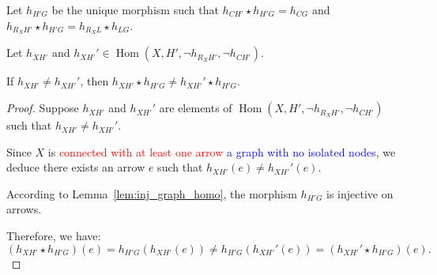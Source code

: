 \begin{lemma}
    \label{lem:1_dist}
    
            

    Let $h_{H'G}$ be the unique morphism such that $h_{CH'} \mathop{\star} h_{H'G} \mathop{=} h_{CG}$ and $h_{R_XH'} \mathop{\star} h_{H'G} \mathop{=} h_{R_XL} \mathop{\star} h_{LG}$.

    Let $h_{XH'}$ and $h_{XH'}' \mathop{\in} \operatorname{Hom}(X, H', \lnot h_{R_XH'}, \lnot h_{CH'})$. 
    
    If $h_{XH'} \mathop{\neq} h_{XH'}'$, then $h_{XH'} \mathop{\star} h_{H'G} \mathop{\neq} h_{XH'}' \mathop{\star} h_{H'G}$.
    
\end{lemma}

\begin{proof}
    Suppose $h_{XH'}$ and $h_{XH'}'$ are elements of $\operatorname{Hom}(X, H', \lnot h_{R_XH'}, \lnot h_{CH'})$ such that $h_{XH'} \mathop{\neq} h_{XH'}'$.

    Since $X$ is \textcolor{red}{connected with at least one arrow} \textcolor{blue}{a graph with no isolated nodes}, we deduce there exists an arrow $e$ such that $h_{XH'}(e) \mathop{\neq} h_{XH'}'(e)$.

    According to Lemma~\ref{lem:inj_graph_homo}, the morphism $h_{H'G}$ is injective on arrows.
    
    Therefore, we have:
    \[
    (h_{XH'} \mathop{\star} h_{H'G})(e) \mathop{=} h_{H'G}(h_{XH'}(e)) \mathop{\neq} h_{H'G}(h_{XH'}'(e)) \mathop{=} (h_{XH'}' \mathop{\star} h_{H'G})(e).
    \]
\end{proof}



